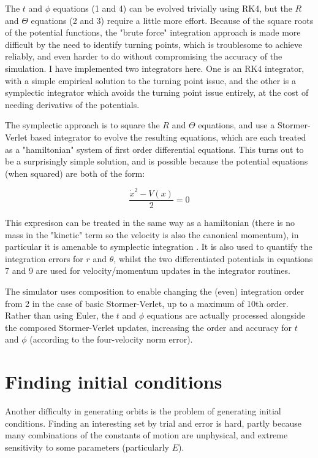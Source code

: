 \documentclass[11pt]{article}
\begin{document}
The $t$ and $\phi$ equations (1 and 4) can be evolved trivially using RK4, but the $R$ and $\Theta$ equations (2 and 3) require a little more effort.  Because of the square roots of the potential functions, the "brute force" integration approach is made more difficult by the need to identify turning points, which is troublesome to achieve reliably, and even harder to do without compromising the accuracy of the simulation.  I have implemented two integrators here.  One is an RK4 integrator, with a simple empirical solution to the turning point issue, and the other is a symplectic integrator which avoids the turning point issue entirely, at the cost of needing derivativs of the potentials.

The symplectic approach is to square the $R$ and $\Theta$ equations, and use a Stormer-Verlet based integrator \cite{hairer} to evolve the resulting equations, which are each treated as a "hamiltonian" system of first order differential equations.  This turns out to be a surprisingly simple solution, and is possible because the potential equations (when squared) are both of the form:

\begin{equation}
\frac {\dot x^2 - V(x)}{2} = 0
\end{equation}

This expresison can be treated in the same way as a hamiltonian (there is no mass in the "kinetic" term so the velocity is also the canonical momentum), in particular it is amenable to symplectic integration \cite{hairer}.  It is also used to quantify the integration errors for $r$ and $\theta$, whilst the two differentiated potentials in equations 7 and 9 are used for velocity/momentum updates in the integrator routines.

The simulator uses composition \cite{hairer} to enable changing the (even) integration order from 2 in the case of basic Stormer-Verlet, up to a maximum of 10th order.  Rather than using Euler, the $t$ and $\phi$ equations are actually processed alongside the composed Stormer-Verlet updates, increasing the order and accuracy for $t$ and $\phi$ (according to the four-velocity norm error).

\section{Finding initial conditions}

Another difficulty in generating orbits is the problem of generating initial conditions.  Finding an interesting set by trial and error is hard, partly because many combinations of the constants of motion are unphysical, and extreme sensitivity to some parameters (particularly $E$).
\end{document}
